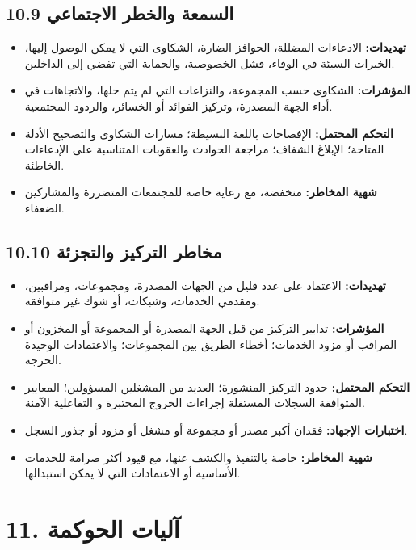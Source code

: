 \documentclass[11pt]{article}
\begin{document}
\subsection*{10.9 السمعة والخطر الاجتماعي}

\begin{itemize}[leftmargin=*]
\item \textbf{تهديدات:} الادعاءات المضللة، الحوافز الضارة، الشكاوى التي لا يمكن الوصول إليها، الخبرات السيئة في الوفاء، فشل الخصوصية، والحماية التي تفضي إلى الداخلين.
\item \textbf{المؤشرات:} الشكاوى حسب المجموعة، والنزاعات التي لم يتم حلها، والاتجاهات في أداء الجهة المصدرة، وتركيز الفوائد أو الخسائر، والردود المجتمعية.
\item \textbf{التحكم المحتمل:} الإفصاحات باللغة البسيطة؛ مسارات الشكاوى والتصحيح الأدلة المتاحة؛ الإبلاغ الشفاف؛ مراجعة الحوادث والعقوبات المتناسبة على الإدعاءات الخاطئة.
\item \textbf{شهية المخاطر:} منخفضة، مع رعاية خاصة للمجتمعات المتضررة والمشاركين الضعفاء.
\end{itemize}
\subsection*{10.10 مخاطر التركيز والتجزئة}

\begin{itemize}[leftmargin=*]
\item \textbf{تهديدات:} الاعتماد على عدد قليل من الجهات المصدرة، ومجموعات، ومراقبين، ومقدمي الخدمات، وشبكات، أو شوك غير متوافقة.
\item \textbf{المؤشرات:} تدابير التركيز من قبل الجهة المصدرة أو المجموعة أو المخزون أو المراقب أو مزود الخدمات؛ أخطاء الطريق بين المجموعات؛ والاعتمادات الوحيدة الحرجة.
\item \textbf{التحكم المحتمل:} حدود التركيز المنشورة؛ العديد من المشغلين المسؤولين؛ المعايير المتوافقة السجلات المستقلة إجراءات الخروج المختبرة و التفاعلية الآمنة.
\item \textbf{اختبارات الإجهاد:} فقدان أكبر مصدر أو مجموعة أو مشغل أو مزود أو جذور السجل.
\item \textbf{شهية المخاطر:} خاصة بالتنفيذ والكشف عنها، مع قيود أكثر صرامة للخدمات الأساسية أو الاعتمادات التي لا يمكن استبدالها.
\end{itemize}

\section*{11. آليات الحوكمة}
\end{document}
